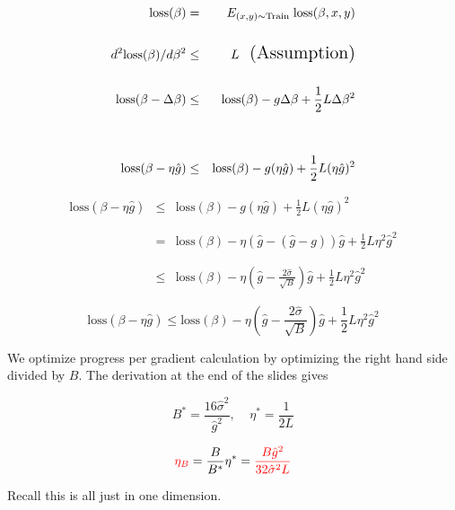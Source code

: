 {

\begin{eqnarray*}
  \mathrm{loss}(\beta) & = & E_{(x,y) \sim \mathrm{Train}}\;\mathrm{loss}(\beta,x,y) \\
  \\
  d^2 \mathrm{loss}(\beta)/d \beta^2 & \leq & L \;\;\;\mbox{\Large (Assumption)} \\
  \\
  \mathrm{loss}(\beta - \Delta\beta) & \leq & \mathrm{loss}(\beta) - g\Delta \beta + \frac{1}{2}L\Delta \beta^2 \\
  \\
  \\
  \mathrm{loss}(\beta - \eta\hat{g}) & \leq & \mathrm{loss}(\beta) - g(\eta\hat{g}) + \frac{1}{2}L(\eta\hat{g})^2
\end{eqnarray*}


\begin{eqnarray*}
  \mathrm{loss}(\beta - \eta\hat{g}) & \leq & \mathrm{loss}(\beta) - g(\eta\hat{g}) + \frac{1}{2}L(\eta\hat{g})^2 \\
  \\
  \\
  & = &  \mathrm{loss}(\beta) - \eta (\hat{g} - (\hat{g} -g)) \hat{g} + \frac{1}{2}L\eta^2 \hat{g}^2 \\
  \\
  \\
  & \leq &  \mathrm{loss}(\beta) - \eta \left(\hat{g} - \frac{2\hat{\sigma}}{\sqrt{B}}\right)\hat{g} + \frac{1}{2}L \eta^2 \hat{g}^2
\end{eqnarray*}


$$\mathrm{loss}(\beta - \eta\hat{g}) \leq \mathrm{loss}(\beta) - \eta \left(\hat{g} - \frac{2\hat{\sigma}}{\sqrt{B}} \right)\hat{g}  + \frac{1}{2}L \eta^2 \hat{g}^2$$

\vfill
We optimize progress per gradient calculation by optimizing the right hand side divided by $B$.  The derivation at the end of the slides gives

\vfill
$$B^*  =  \frac{16\hat{\sigma}^2}{\hat{g}^2},\;\;\;\;\eta^*  =  \frac{1}{2L}$$

\vfill
$${\color{red} \eta_B} = \frac{B}{B^*} \eta^* = {\color{red} \frac{B \hat{g}^2}{32\hat{\sigma}^2L}}$$

\vfill
Recall this is all just in one dimension.

}
